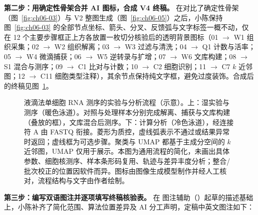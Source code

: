 \textbf{第二步：用确定性骨架合并 AI 图标，合成 V4 终稿。}
在对比了确定性骨架（图~\ref{fig:ch06-03}）与 V2 整图生成（图~\ref{fig:ch06-05}）之后，小陈保持图~\ref{fig:ch06-03} 的全部节点坐标、箭头、分叉、反馈弧与文字标签一概不动，仅在 12 个主要步骤框正上方各放置一枚切分核验后的透明背景图标（01 $\rightarrow$ W1 组织采集；02 $\rightarrow$ W2 组织解离；03 $\rightarrow$ W3 过滤与清洗；04 $\rightarrow$ Q1 计数与活率；05 $\rightarrow$ W4 微滴捕获；06 $\rightarrow$ W5 逆转录与扩增；07 $\rightarrow$ W6 文库构建；08 $\rightarrow$ S1 混合与测序；09 $\rightarrow$ C1 比对与计数；10 $\rightarrow$ C2 细胞识别；11 $\rightarrow$ C7 $k$ 近邻图；12 $\rightarrow$ C11 细胞类型注释），其余节点保持纯文字框，避免过度装饰。合成后的终稿见图~\ref{fig:ch06-06}。

\begin{figure}[htbp]\centering
\resizebox{\linewidth}{!}{}
\caption{液滴法单细胞 RNA 测序的实验与分析流程（示意）。上：湿实验与测序（暖色泳道）。对照与处理样本分别完成解离、捕获与文库构建（叠放的框），文库混合后测序。下：计算分析（冷色泳道），经连接符 A 由 FASTQ 衔接。菱形为质控，虚线弧表示不通过或结果异常时返回；虚线框为可选步骤。聚类与 UMAP 都基于主成分空间的 $k$ 近邻图，UMAP 仅用于展示。本图为通用流程的简化，未画出具体参数、细胞核测序、样本条形码复用、轨迹与差异丰度分析；整合/批次校正的位置因软件而异。图标由图像生成模型制作并经人工核对，流程结构与文字由作者绘制。}\label{fig:ch06-06}
\end{figure}

\textbf{第三步：编写双语图注并逐项填写终稿核验表。}
在 \scidraw{} 图注辅助（）起草的描述基础上，小陈补齐了简化范围、算法位置差异及 AI 分工声明，定稿中英文图注如下：

